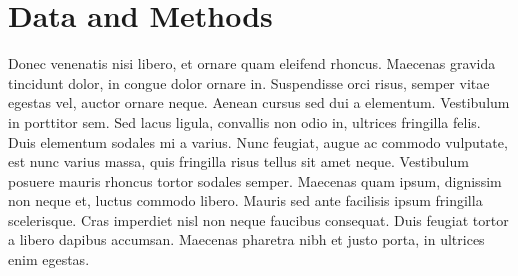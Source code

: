 \documentclass{article}
\theoremstyle{plain}
\theoremstyle{definition}
\theoremstyle{remark}
\begin{document}
\section{Data and Methods}\label{sec:methods}


% 

Donec venenatis nisi libero, et ornare quam eleifend rhoncus. Maecenas gravida tincidunt dolor, in congue dolor ornare in. Suspendisse orci risus, semper vitae egestas vel, auctor ornare neque. Aenean cursus sed dui a elementum. Vestibulum in porttitor sem. Sed lacus ligula, convallis non odio in, ultrices fringilla felis. Duis elementum sodales mi a varius. Nunc feugiat, augue ac commodo vulputate, est nunc varius massa, quis fringilla risus tellus sit amet neque. Vestibulum posuere mauris rhoncus tortor sodales semper. Maecenas quam ipsum, dignissim non neque et, luctus commodo libero. Mauris sed ante facilisis ipsum fringilla scelerisque. Cras imperdiet nisl non neque faucibus consequat. Duis feugiat tortor a libero dapibus accumsan. Maecenas pharetra nibh et justo porta, in ultrices enim egestas. 
\end{document}
